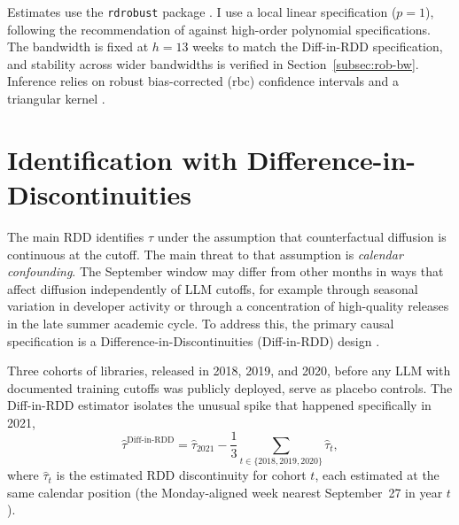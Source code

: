 \documentclass[12pt, a4paper]{report}
\begin{document}
Estimates use the \texttt{rdrobust} package \citep{calonico2014robust, calonico2020rdrobust}. I use a local linear specification ($p = 1$), following the recommendation of \citet{gelman2019high} against high-order polynomial specifications. The bandwidth is fixed at $h = 13$ weeks to match the Diff-in-RDD specification, and stability across wider bandwidths is verified in Section~\ref{subsec:rob-bw}. Inference relies on robust bias-corrected (rbc) confidence intervals \citep{calonico2022coverage} and a triangular kernel \citep{fan1996local}.

\section{Identification with Difference-in-Discontinuities}\label{sec:methods-diffrdd}
The main RDD identifies $\tau$ under the assumption that counterfactual diffusion is continuous at the cutoff. The main threat to that assumption is \textit{calendar confounding}. The September window may differ from other months in ways that affect diffusion independently of LLM cutoffs, for example through seasonal variation in developer activity or through a concentration of high-quality releases in the late summer academic cycle. To address this, the primary causal specification is a Difference-in-Discontinuities (Diff-in-RDD) design \citep{grembi2016fiscal}.

Three cohorts of libraries, released in 2018, 2019, and 2020, before any LLM with documented training cutoffs was publicly deployed, serve as placebo controls. The Diff-in-RDD estimator isolates the unusual spike that happened specifically in 2021,
$$\hat{\tau}^{\text{Diff-in-RDD}} = \hat{\tau}_{2021} - \frac{1}{3}\sum_{t \in \{2018,2019,2020\}} \hat{\tau}_t,$$
where $\hat{\tau}_t$ is the estimated RDD discontinuity for cohort $t$, each estimated at the same calendar position (the Monday-aligned week nearest September~27 in year $t$).
\end{document}
